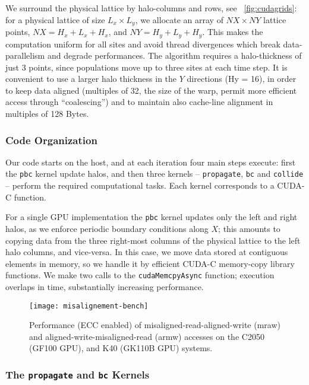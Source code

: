 \documentclass{elsarticle}
\begin{document}
We surround the physical lattice by halo-columns 
and rows, see \figurename~\ref{fig:cudagrids}: for
a physical lattice of size $L_x \times L_y$, we allocate 
an array of $NX \times NY$ lattice points, $NX=H_x+L_x+H_x$, and 
$NY=H_y+L_y+H_y$. 
%
This makes the computation uniform for all sites and avoid 
thread divergences which break data-parallelism and degrade performances. 
%
The algorithm requires a halo-thickness of just 3 points, since populations 
move up to three sites at each time step. 
%
It is convenient to use a larger halo thickness in the $Y$ directions 
(Hy = 16), in order to keep data aligned (multiples of 32, the size of 
the warp, permit more efficient access through ``coalescing'') and to 
maintain also cache-line alignment in multiples of 128 Bytes.
 
\subsubsection*{Code Organization}

Our code starts on the host, and at each iteration four main steps 
execute: first the {\tt pbc} kernel update halos, and then three kernels 
-- {\tt propagate}, {\tt bc} and {\tt collide} -- perform the 
required computational tasks. Each kernel corresponds to a CUDA-C function.

For a single GPU implementation the {\tt pbc} kernel updates only 
the left and right halos, as we enforce periodic boundary conditions along $X$; 
this amounts to copying data from the three right-most columns of the physical 
lattice to the left halo columns, and vice-versa. In this case, we 
move data stored at contiguous elements in memory, so we handle it by 
efficient CUDA-C memory-copy library functions. We make two calls to the 
{\tt cudaMemcpyAsync} function; execution overlaps in time, substantially 
increasing performance.

%
\begin{figure}[!t]
\centering
\texttt{[image: misalignement-bench]}
%
\caption{
\label{misalignement}
Performance (ECC enabled) of misaligned-read-aligned-write 
(mraw) and aligned-write-misaligned-read (armw) accesses on the C2050 
(GF100 GPU), and K40 (GK110B GPU) systems.
}
\end{figure}
%

\subsubsection*{The {\tt propagate} and {\tt bc} Kernels}
 
\end{document}
